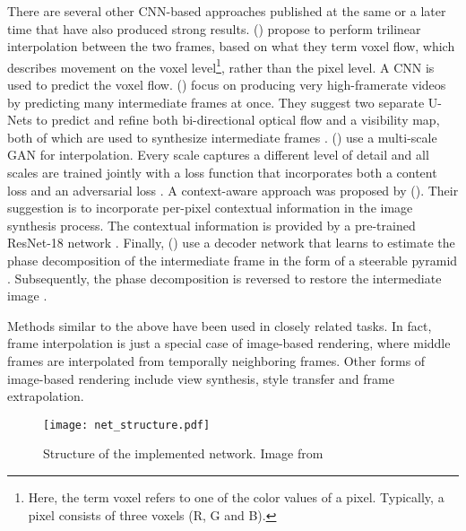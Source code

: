 \documentclass[10pt,twocolumn,letterpaper]{article}
\newcommand{\citay}[1][]{\citeauthor{#1} (\citeyear{#1})}
\begin{document}
There are several other CNN-based approaches published at the same or a later time that have also produced strong results. \citay[DeepVoxelFlow2017] propose to perform trilinear interpolation between the two frames, based on what they term voxel flow, which describes movement on the voxel level\footnote{Here, the term voxel refers to one of the color values of a pixel. Typically, a pixel consists of three voxels (R, G and B).}, rather than the pixel level. A CNN is used to predict the voxel flow. \citay[SuperSloMo] focus on producing very high-framerate videos by predicting many intermediate frames at once. They suggest two separate U-Nets to predict and refine both bi-directional optical flow and a visibility map, both of which are used to synthesize intermediate frames \cite{SuperSloMo}. \citay[MultiScaleDeepLossAndGAN] use a multi-scale GAN for interpolation. Every scale captures a different level of detail and all scales are trained jointly with a loss function that incorporates both a content loss and an adversarial loss \cite{MultiScaleDeepLossAndGAN}. A context-aware approach was proposed by \citay[ContextAware2018]. Their suggestion is to incorporate per-pixel contextual information in the image synthesis process. The contextual information is provided by a pre-trained ResNet-18 network \cite{ResNet2016}. Finally, \citay[PhaseNet] use a decoder network that learns to estimate the phase decomposition of the intermediate frame in the form of a steerable pyramid \cite{SteerablePyramid1995}. Subsequently, the phase decomposition is reversed to restore the intermediate image \cite{PhaseNet}.

Methods similar to the above have been used in closely related tasks. In fact, frame interpolation is just a special case of image-based rendering, where middle frames are interpolated from temporally neighboring frames. Other forms of image-based rendering include view synthesis, style transfer and frame extrapolation.

\begin{figure*}
    \begin{center}
    	\texttt{[image: net\_structure.pdf]}
    \end{center}
    \caption{Structure of the implemented network. Image from \citeauthor{SepConv}}
    \label{fig:networkstructure}
\end{figure*}

\end{document}
